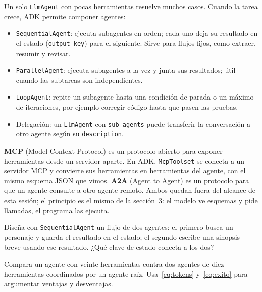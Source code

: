 \documentclass[11pt,letterpaper,oneside]{report}
\begin{document}
Un solo \texttt{LlmAgent} con pocas herramientas resuelve muchos casos. Cuando la tarea crece, ADK permite componer agentes:

\begin{itemize}
  \item \texttt{SequentialAgent}: ejecuta subagentes en orden; cada uno deja su resultado en el estado (\texttt{output\_key}) para el siguiente. Sirve para flujos fijos, como extraer, resumir y revisar.
  \item \texttt{ParallelAgent}: ejecuta subagentes a la vez y junta sus resultados; útil cuando las subtareas son independientes.
  \item \texttt{LoopAgent}: repite un subagente hasta una condición de parada o un máximo de iteraciones, por ejemplo corregir código hasta que pasen las pruebas.
  \item Delegación: un \texttt{LlmAgent} con \texttt{sub\_agents} puede transferir la conversación a otro agente según su \texttt{description}.
\end{itemize}

\textbf{MCP} (Model Context Protocol) es un protocolo abierto para exponer herramientas desde un servidor aparte. En ADK, \texttt{McpToolset} se conecta a un servidor MCP y convierte sus herramientas en herramientas del agente, con el mismo esquema JSON que vimos. \textbf{A2A} (Agent to Agent) es un protocolo para que un agente consulte a otro agente remoto. Ambos quedan fuera del alcance de esta sesión; el principio es el mismo de la sección~3: el modelo ve esquemas y pide llamadas, el programa las ejecuta.

\begin{ejercicio}
Diseña con \texttt{SequentialAgent} un flujo de dos agentes: el primero busca un personaje y guarda el resultado en el estado; el segundo escribe una sinopsis breve usando ese resultado. ¿Qué clave de estado conecta a los dos?
\end{ejercicio}

\begin{ejercicio}
Compara un agente con veinte herramientas contra dos agentes de diez herramientas coordinados por un agente raíz. Usa~\eqref{eq:tokens} y~\eqref{eq:exito} para argumentar ventajas y desventajas.
\end{ejercicio}
\end{document}
